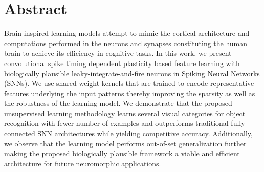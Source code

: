 \documentclass[journal, onecolumn]{IEEEtran}
\begin{document}

\maketitle
\thispagestyle{plain}
\pagestyle{plain}


%


\vspace{-5.0ex}

\section*{\large\bf{Abstract}}
Brain-inspired learning models attempt to mimic the cortical architecture and computations performed in the neurons and synapses constituting the human brain to achieve its efficiency in cognitive tasks. In this work, we present convolutional spike timing dependent plasticity based feature learning with biologically plausible leaky-integrate-and-fire neurons in Spiking Neural Networks (SNNs). We use shared weight kernels that are trained to encode representative features underlying the input patterns thereby improving the sparsity as well as the robustness of the learning model. We demonstrate that the proposed unsupervised learning methodology learns several visual categories for object recognition with fewer number of examples and outperforms traditional fully-connected SNN architectures while yielding competitive accuracy. Additionally, we observe that the learning model performs out-of-set generalization further making the proposed biologically plausible framework a viable and efficient architecture for future neuromorphic applications. 
\end{document}

